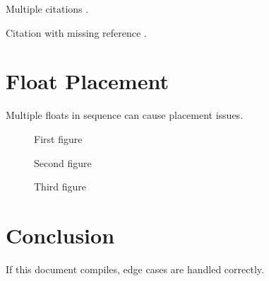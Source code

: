 \documentclass[11pt]{article}
\begin{document}
Multiple citations \cite{butterick2019practical,brown2018flexible,hochuli1987detail}.

Citation with missing reference \cite{nonexistent2023}.

\section{Float Placement}

Multiple floats in sequence can cause placement issues.

\begin{figure}[tbp]
  \centering
  \fbox{\rule{0pt}{1cm}\rule{0.5\textwidth}{0pt}}
  \caption{First figure}
\end{figure}

\begin{figure}[tbp]
  \centering
  \fbox{\rule{0pt}{1cm}\rule{0.5\textwidth}{0pt}}
  \caption{Second figure}
\end{figure}

\begin{figure}[tbp]
  \centering
  \fbox{\rule{0pt}{1cm}\rule{0.5\textwidth}{0pt}}
  \caption{Third figure}
\end{figure}

\section{Conclusion}

If this document compiles, edge cases are handled correctly.

\printbibliography
\end{document}
